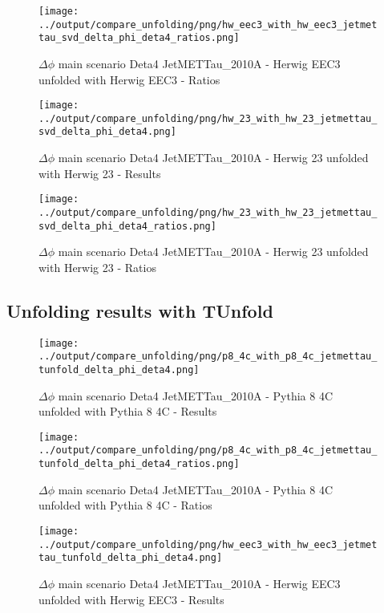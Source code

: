 \documentclass[11pt]{book}
\begin{document}
\begin{figure}[ht]
\centering
\texttt{[image: ../output/compare\_unfolding/png/hw\_eec3\_with\_hw\_eec3\_jetmettau\_svd\_delta\_phi\_deta4\_ratios.png]}
\caption{$\Delta\phi$ main scenario Deta4 JetMETTau\_2010A - Herwig EEC3 unfolded with Herwig EEC3 - Ratios}
\label{hw_eec3_hw_eec3_jetmettau_svd_delta_phi_deta4_b}
\end{figure}

\begin{figure}[ht]
\centering
\texttt{[image: ../output/compare\_unfolding/png/hw\_23\_with\_hw\_23\_jetmettau\_svd\_delta\_phi\_deta4.png]}
\caption{$\Delta\phi$ main scenario Deta4 JetMETTau\_2010A - Herwig 23 unfolded with Herwig 23 - Results}
\label{hw_23_hw_23_jetmettau_svd_delta_phi_deta4_a}
\end{figure}

\begin{figure}[ht]
\centering
\texttt{[image: ../output/compare\_unfolding/png/hw\_23\_with\_hw\_23\_jetmettau\_svd\_delta\_phi\_deta4\_ratios.png]}
\caption{$\Delta\phi$ main scenario Deta4 JetMETTau\_2010A - Herwig 23 unfolded with Herwig 23 - Ratios}
\label{hw_23_hw_23_jetmettau_svd_delta_phi_deta4_b}
\end{figure}


\clearpage
\subsection{Unfolding results with TUnfold}

\begin{figure}[ht]
\centering
\texttt{[image: ../output/compare\_unfolding/png/p8\_4c\_with\_p8\_4c\_jetmettau\_tunfold\_delta\_phi\_deta4.png]}
\caption{$\Delta\phi$ main scenario Deta4 JetMETTau\_2010A - Pythia 8 4C unfolded with Pythia 8 4C - Results}
\label{p8_p8_jetmettau_tunfold_delta_phi_deta4_a}
\end{figure}

\begin{figure}[ht]
\centering
\texttt{[image: ../output/compare\_unfolding/png/p8\_4c\_with\_p8\_4c\_jetmettau\_tunfold\_delta\_phi\_deta4\_ratios.png]}
\caption{$\Delta\phi$ main scenario Deta4 JetMETTau\_2010A - Pythia 8 4C unfolded with Pythia 8 4C - Ratios}
\label{p8_p8_jetmettau_tunfold_delta_phi_deta4_b}
\end{figure}

\begin{figure}[ht]
\centering
\texttt{[image: ../output/compare\_unfolding/png/hw\_eec3\_with\_hw\_eec3\_jetmettau\_tunfold\_delta\_phi\_deta4.png]}
\caption{$\Delta\phi$ main scenario Deta4 JetMETTau\_2010A - Herwig EEC3 unfolded with Herwig EEC3 - Results}
\label{hw_eec3_hw_eec3_jetmettau_tunfold_delta_phi_deta4_a}
\end{figure}
\end{document}
